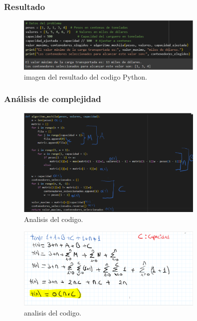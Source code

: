 \subsubsection{Resultado}
\begin{figure}[H]
	\centering
	\includegraphics[width=0.8\textwidth]{resultado_mochila_ejem1.png}
	\caption{imagen del resultado del codigo Python.}
	\label{fig:resultado}
\end{figure}

\subsubsection{Análisis de complejidad}
\begin{figure}[H]
	\centering
	\includegraphics[width=0.8\textwidth]{complejidad_mochila_ejem1.png}
	\caption{Analisis del codigo.}
	\label{fig:complejidad1}
\end{figure}

\begin{figure}[H]
	\centering
	\includegraphics[width=0.8\textwidth]{complejidad_mochila_ejem1_2.png}
	\caption{analisis del codigo.}
	\label{fig:complejidad2}
\end{figure}

